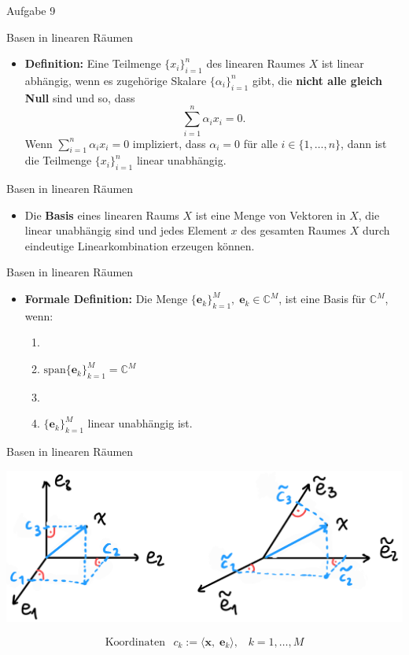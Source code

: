 \documentclass[14pt, aspectratio=169, handout]{beamer}
\begin{document}
\begin{frame}{Aufgabe 9} 
\end{frame}

\begin{frame}{Basen in linearen Räumen}
    \begin{itemize}
    \item[] \textbf{Definition:} Eine Teilmenge $\{ x_i\}_{i=1}^n$ des linearen Raumes $X$ ist linear abhängig, wenn es zugehörige Skalare $\{\alpha_i\}_{i=1}^n$ gibt, die \textbf{nicht alle gleich Null} sind und so, dass $$\sum_{i=1}^n \alpha_i x_i = 0.$$ Wenn $\sum_{i=1}^n \alpha_i x_i = 0$ impliziert, dass $\alpha_i = 0$ für alle $i \in \{ 1, \dots, n\}$, dann ist die Teilmenge $\{ x_i\}_{i=1}^n$ linear unabhängig.
\end{itemize}
\end{frame}

\begin{frame}{Basen in linearen Räumen}
    \begin{itemize}
    \item Die \textbf{Basis} eines linearen Raums $X$ ist eine Menge von Vektoren in $X$, die linear unabhängig sind und jedes Element $x$ des gesamten Raumes $X$ durch eindeutige Linearkombination erzeugen können.
\end{itemize}

\end{frame}

\begin{frame}{Basen in linearen Räumen}
    \begin{itemize}
        \item \textbf{Formale Definition:} Die Menge $\{\mathbf{e}_k\}_{k=1}^M, \; \mathbf{e}_k \in \mathbb{C}^M$, ist eine Basis für $\mathbb{C}^M$, wenn:
    \begin{enumerate}
        \item[] 
        \item $\text{span}\{\mathbf{e}_k\}_{k=1}^M = \mathbb{C}^M$
        \item[] 
        \item $\{\mathbf{e}_k\}_{k=1}^M$ linear unabhängig ist.
    \end{enumerate}
    \end{itemize}
\end{frame}

\begin{frame}{Basen in linearen Räumen}
    \begin{center}
        \includegraphics[width=0.6\linewidth]{figures/Basen.jpg}
    \end{center}
    $$\text{Koordinaten } \hspace{5pt} c_k := \langle \mathbf{x}, \; \mathbf{e}_k \rangle, \hspace{10pt} k=1, \dots, M$$
\end{frame}
\end{document}
